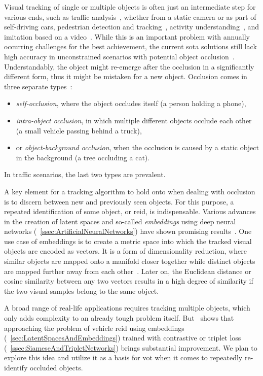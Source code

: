 Visual tracking of single or multiple objects is often just an intermediate step for various ends, such as traffic analysis~\cite{tang2019cityflow}, whether from a static camera or as part of self-driving cars, pedestrian detection and tracking~\cite{lealtaixe2017tracking}, activity understanding~\cite{finn2017oneshotimitation}, and imitation based on a video~\cite{peng2018sfv}. While this is an important problem with annually occurring challenges for the best achievement, the current \gls{sota} solutions still lack high accuracy in unconstrained scenarios with potential object occlusion~\cite{jiyan2007robustocclusion}. Understandably, the object might re-emerge after the occlusion in a significantly different form, thus it might be mistaken for a new object. Occlusion comes in three separate types~\cite{gabriel2003sotamot}:
\begin{itemize}
    \item \emph{self-occlusion}, where the object occludes itself (a person holding a phone),
    \item \emph{intra-object occlusion}, in which multiple different objects occlude each other (a small vehicle passing behind a truck),
    \item or \emph{object-background occlusion}, when the occlusion is caused by a static object in the background (a tree occluding a cat).
\end{itemize}
In traffic scenarios, the last two types are prevalent.

A key element for a tracking algorithm to hold onto when dealing with occlusion is to discern between new and previously seen objects. For this purpose, a repeated identification of some object, or \gls{reid}, is indispensable. Various advances in the creation of latent spaces and so-called \emph{embeddings} using deep neural networks (\sectiontext{}~\ref{ssec:ArtificialNeuralNetworks}) have shown promising results~\cite{schroff2015facenet, taigman2014deepface}. One use case of embeddings is to create a metric space into which the tracked visual objects are encoded as vectors. It is a form of dimensionality reduction, where similar objects are mapped onto a manifold closer together while distinct objects are mapped further away from each other~\cite{hadsell2006dimreduction}. Later on, the Euclidean distance or cosine similarity between any two vectors results in a high degree of similarity if the two visual samples belong to the same object.

A broad range of real-life applications requires tracking multiple objects, which only adds complexity to an already tough problem itself. But~\cite{kuma2019vehiclereid} shows that approaching the problem of vehicle \gls{reid} using embeddings (\sectiontext{}~\ref{sec:LatentSpacesAndEmbeddings}) trained with contrastive or triplet loss (\sectiontext{}~\ref{ssec:SiameseAndTripletNetworks}) brings substantial improvement. We plan to explore this idea and utilize it as a basis for \gls{vot} when it comes to repeatedly re-identify occluded objects.

